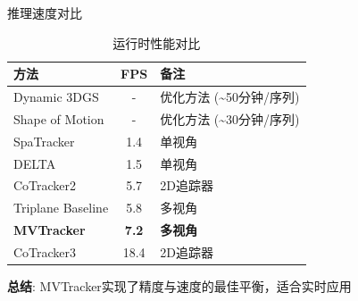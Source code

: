 \documentclass{ctexbeamer}
\begin{document}
\begin{frame}{推理速度对比}
  \begin{table}
    \centering
    \caption{运行时性能对比}
    \begin{tabular}{l|c|l}
      \hline
      方法 & FPS & 备注 \\
      \hline
      Dynamic 3DGS & - & 优化方法 (\~{}50分钟/序列) \\
      Shape of Motion & - & 优化方法 (\~{}30分钟/序列) \\
      SpaTracker & 1.4 & 单视角 \\
      DELTA & 1.5 & 单视角 \\
      CoTracker2 & 5.7 & 2D追踪器 \\
      Triplane Baseline & 5.8 & 多视角 \\
      \rowcolor{cyan!20} \textbf{MVTracker} & \textbf{7.2} & \textbf{多视角} \\
      CoTracker3 & 18.4 & 2D追踪器 \\
      \hline
    \end{tabular}
  \end{table}
  
  \vspace{0.2cm}
  \textbf{总结}: MVTracker实现了\alert{精度与速度的最佳平衡}，适合实时应用
\end{frame}
\end{document}
